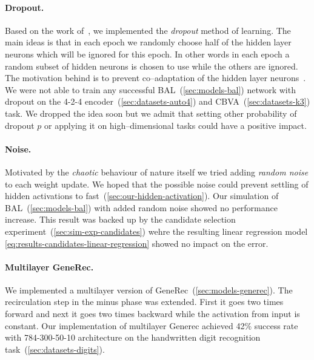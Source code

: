 


\paragraph{Dropout.}
Based on the work of~\citet{hinton2012improving}, we implemented the \emph{dropout} method of learning. The main ideas is that in each epoch we randomly choose half of the hidden layer neurons which will be ignored for this epoch. In other words in each epoch a random subset of hidden neurons is chosen to use while the others are ignored. The motivation behind is to prevent co--adaptation of the hidden layer neurons~\citep{hinton2012improving}. We were not able to train any successful BAL~(\ref{sec:models-bal}) network with dropout on the 4-2-4 encoder~(\ref{sec:datasets-auto4}) and CBVA~(\ref{sec:datasets-k3}) task. We dropped the idea soon but we admit that setting other probability of dropout $p$ or applying it on high--dimensional tasks could have a positive impact. 

\paragraph{Noise.} 

Motivated by the \emph{chaotic} behaviour of nature itself we tried adding \emph{random noise} to each weight update. We hoped that the possible noise could prevent settling of hidden activations to fast~(\ref{sec:our-hidden-activation}). Our simulation of BAL~(\ref{sec:models-bal}) with added random noise showed no performance increase. This result was backed up by the candidate selection experiment~(\ref{sec:sim-exp-candidates}) wehre the resulting linear regression model \ref{eq:results-candidates-linear-regression} showed no impact on the error. 

\paragraph{Multilayer GeneRec.}

We implemented a multilayer version of GeneRec~(\ref{sec:models-generec}). The recirculation step in the minus phase was extended. First it goes two times forward and next it goes two times backward while the activation from input is constant. Our implementation of multilayer Generec achieved 42\% success rate with 784-300-50-10 architecture on the handwritten digit recognition task~(\ref{sec:datasets-digits}). 
